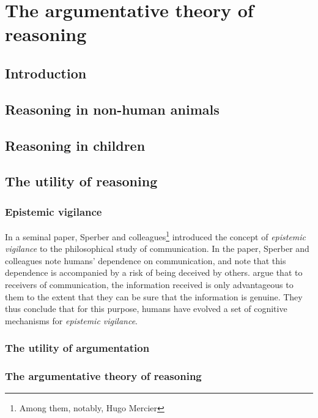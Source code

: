 \chapter{The argumentative theory of reasoning}
\label{ch:reasoning}

\section*{Introduction}

\section{Reasoning in non-human animals}

\section{Reasoning in children}

\section{The utility of reasoning}

\subsection{Epistemic vigilance}

In a seminal \citeyear{Sperber10} paper, Sperber and colleagues\footnote{Among them, notably, Hugo Mercier} introduced the concept of \emph{epistemic vigilance} to the philosophical study of communication.
In the paper, Sperber and colleagues note humans' dependence on communication, and note that this dependence is accompanied by a risk of being deceived by others.
argue that to receivers of communication, the information received is only advantageous to them to the extent that they can be sure that the information is genuine.
They thus conclude that for this purpose, humans have evolved a set of cognitive mechanisms for \emph{epistemic vigilance}.

\subsection{The utility of argumentation}

\subsection{The argumentative theory of reasoning}
